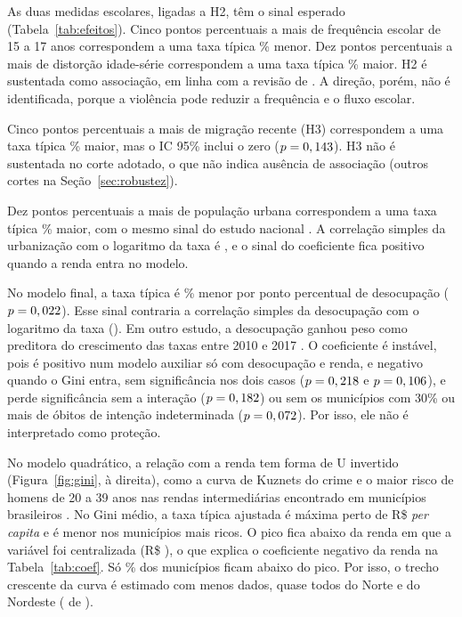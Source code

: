 \documentclass[a4paper,11pt]{article}
\begin{document}
As duas medidas escolares, ligadas a H2, têm o sinal esperado (Tabela~\ref{tab:efeitos}). Cinco pontos percentuais a mais de frequência escolar de 15 a 17 anos correspondem a uma taxa típica \nEfFreq\% menor. Dez pontos percentuais a mais de distorção idade-série correspondem a uma taxa típica \nEfDist\% maior. H2 é sustentada como associação, em linha com a revisão de \citet{wanzinack2018}. A direção, porém, não é identificada, porque a violência pode reduzir a frequência e o fluxo escolar.

Cinco pontos percentuais a mais de migração recente (H3) correspondem a uma taxa típica \nEfMigr\% maior, mas o IC 95\% inclui o zero ($p = 0,143$). H3 não é sustentada no corte adotado, o que não indica ausência de associação (outros cortes na Seção~\ref{sec:robustez}).

Dez pontos percentuais a mais de população urbana correspondem a uma taxa típica \nEfUrb\% maior, com o mesmo sinal do estudo nacional \citep{wanzinack2022}. A correlação simples da urbanização com o logaritmo da taxa é \nCorUrbana, e o sinal do coeficiente fica positivo quando a renda entra no modelo.

No modelo final, a taxa típica é \nEfDesoc\% menor por ponto percentual de desocupação ($p = 0,022$). Esse sinal contraria a correlação simples da desocupação com o logaritmo da taxa (\nCorDesocup). Em outro estudo, a desocupação ganhou peso como preditora do crescimento das taxas entre 2010 e 2017 \citep{aransiola2021}. O coeficiente é instável, pois é positivo num modelo auxiliar só com desocupação e renda, e negativo quando o Gini entra, sem significância nos dois casos ($p = 0,218$ e $p = 0,106$), e perde significância sem a interação ($p = 0,182$) ou sem os \nNSensDesoc{} municípios com 30\% ou mais de óbitos de intenção indeterminada ($p = 0,072$). Por isso, ele não é interpretado como proteção.



No modelo quadrático, a relação com a renda tem forma de U invertido (Figura~\ref{fig:gini}, à direita), como a curva de Kuznets do crime \citep{buonanno2017} e o maior risco de homens de 20 a 39 anos nas rendas intermediárias encontrado em municípios brasileiros \citep{duarte2012}. No Gini médio, a taxa típica ajustada é máxima perto de R\$ \nPico{} \textit{per capita} e é menor nos municípios mais ricos. O pico fica abaixo da renda em que a variável foi centralizada (R\$ \nCentroRenda), o que explica o coeficiente negativo da renda na Tabela~\ref{tab:coef}. Só \nPctAbaixoPico\% dos municípios ficam abaixo do pico. Por isso, o trecho crescente da curva é estimado com menos dados, quase todos do Norte e do Nordeste (\nNAbaixoPicoNNE{} de \nNAbaixoPico).
\end{document}
